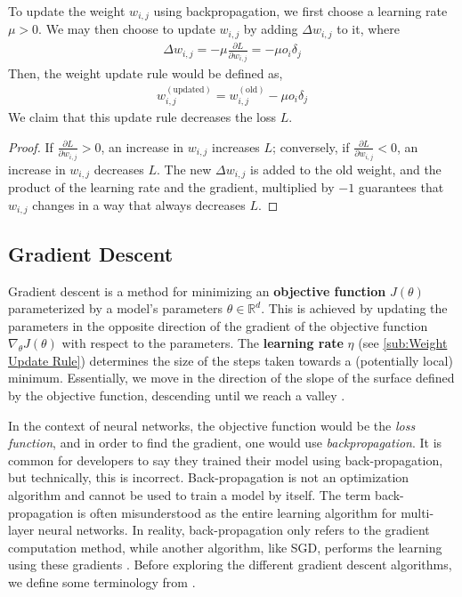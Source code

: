 \documentclass{article}
\begin{document}
  To update the weight $w_{i,j}$ using backpropagation, we first choose a learning rate $\mu> 0$. We may then choose to update $w_{i,j}$ by adding $\Delta w_{i,j}$ to it, where
  \begin{equation*}
    \begin{split}
      \Delta w_{i,j} = -\mu \frac{\partial {L}}{\partial {w_{i,j}}}  = - \mu  o_i \delta_j
    \end{split}
  \end{equation*}
 Then, the weight update rule would be defined as, 
 \begin{equation*}
  \begin{split}
    w_{i,j}^{(\text{updated})} =  w_{i,j}^{(\text{old})} - \mu  o_i \delta_j
  \end{split}
 \end{equation*}
 We claim that this update rule decreases the loss $L$. 
 \begin{proof} 
  
If ${\frac {\partial L}{\partial w_{i,j}}}>0$, an increase in $w_{i,j}$ increases $L$; conversely, if $\frac {\partial L}{\partial w_{i,j}}<0$, an increase in $w_{i,j}$ decreases $L$. The new $\Delta w_{i,j}$ is added to the old weight, and the product of the learning rate and the gradient, multiplied by $-1$ guarantees that $w_{i,j}$  changes in a way that always decreases $L$. 

 \end{proof}
\subsection{Gradient Descent}%
  \label{sub:Gradient Descent}
  
Gradient descent is a method for minimizing an \textbf{objective function} \( J(\theta) \) parameterized by a model's parameters \( \theta \in \mathbb{R}^d \). This is achieved by updating the parameters in the opposite direction of the gradient of the objective function \( \nabla_{\theta} J(\theta) \) with respect to the parameters. The \textbf{learning rate} \( \eta \) (see \autoref{sub:Weight Update Rule}) determines the size of the steps taken towards a (potentially local) minimum. Essentially, we move in the direction of the slope of the surface defined by the objective function, descending until we reach a valley \citep{ruder2017overview}. 

   In the context of neural networks, the objective function would be the \textit{loss function}, and in order to find the gradient, one would use \textit{backpropagation}. It is common for developers to say they trained their model using back-propagation, but technically, this is incorrect. Back-propagation is not an optimization algorithm and cannot be used to train a model by itself. The term back-propagation is often misunderstood as the entire learning algorithm for multi-layer neural networks. In reality, back-propagation only refers to the gradient computation method, while another algorithm, like SGD, performs the learning using these gradients \citep{Goodfellow-et-al-2016}. Before exploring the different gradient descent algorithms, we define some terminology from \cite{batchvsEpoch}. 
\end{document}
